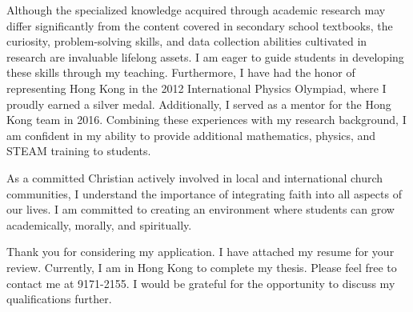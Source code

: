 \documentclass[11pt, a4paper]{awesome-cv}
\begin{document}
\begin{cvletter}
Although the specialized knowledge acquired through academic research may differ significantly from the content covered in secondary school textbooks, the curiosity, problem-solving skills, and data collection abilities cultivated in research are invaluable lifelong assets. I am eager to guide students in developing these skills through my teaching. Furthermore, I have had the honor of representing Hong Kong in the 2012 International Physics Olympiad, where I proudly earned a silver medal. Additionally, I served as a mentor for the Hong Kong team in 2016. Combining these experiences with my research background, I am confident in my ability to provide additional mathematics, physics, and STEAM training to students.

As a committed Christian actively involved in local and international church communities, I understand the importance of integrating faith into all aspects of our lives. I am committed to creating an environment where students can grow academically, morally, and spiritually.

Thank you for considering my application. I have attached my resume for your review. Currently, I am in Hong Kong to complete my thesis. Please feel free to contact me at 9171-2155. I would be grateful for the opportunity to discuss my qualifications further.

\end{cvletter}


\makeletterclosing
\end{document}
